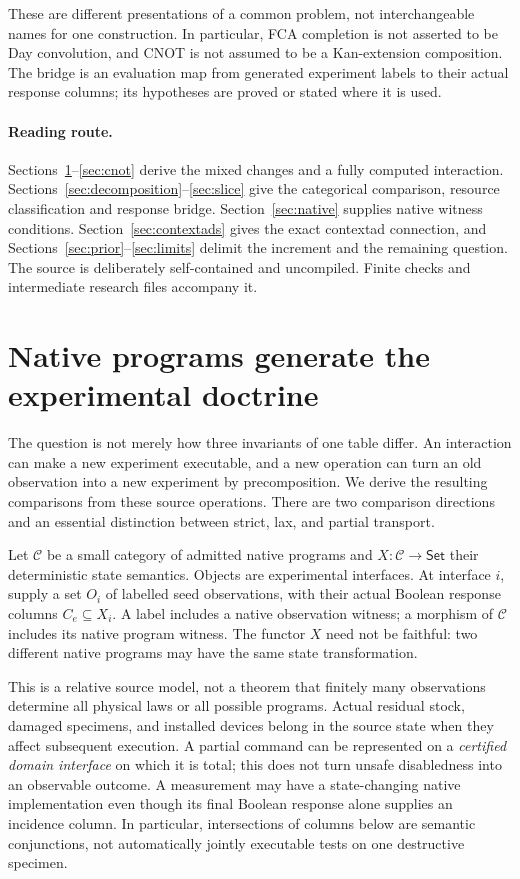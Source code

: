 \documentclass[11pt]{article}
\theoremstyle{definition}\newtheorem{definition}[theorem]{Definition}
\theoremstyle{remark}\newtheorem{remark}[theorem]{Remark}
\begin{document}
These are different presentations of a common problem, not interchangeable
names for one construction. In particular, FCA completion is not asserted
to be Day convolution, and CNOT is not assumed to be a Kan-extension
composition. The bridge is an evaluation map from generated experiment
labels to their actual response columns; its hypotheses are proved or
stated where it is used.

\paragraph{Reading route.}
Sections~\ref{sec:source}--\ref{sec:cnot} derive the mixed changes and a
fully computed interaction. Sections~\ref{sec:decomposition}--\ref{sec:slice}
give the categorical comparison, resource classification and response
bridge. Section~\ref{sec:native} supplies native witness conditions.
Section~\ref{sec:contextads} gives the exact contextad connection, and
Sections~\ref{sec:prior}--\ref{sec:limits} delimit the increment and the
remaining question. The source is deliberately self-contained and
uncompiled. Finite checks and intermediate research files accompany it.


\section{Native programs generate the experimental doctrine}\label{sec:source}
The question is not merely how three invariants of one table differ.
An interaction can make a new experiment executable, and a new operation
can turn an old observation into a new experiment by precomposition.
We derive the resulting comparisons from these source operations. There
are two comparison directions and an essential distinction between
strict, lax, and partial transport.

Let $\mathcal C$ be a small category of admitted native programs and
$X:\mathcal C\to\mathsf{Set}$ their deterministic state semantics.
Objects are experimental interfaces. At interface $i$, supply a set
$O_i$ of labelled seed observations, with their actual Boolean response
columns $C_e\subseteq X_i$. A label includes a native observation
witness; a morphism of $\mathcal C$ includes its native program witness.
The functor $X$ need not be faithful: two different native programs may
have the same state transformation.

This is a relative source model, not a theorem that finitely many
observations determine all physical laws or all possible programs.
Actual residual stock, damaged specimens, and installed devices belong
in the source state when they affect subsequent execution. A partial
command can be represented on a \emph{certified domain interface} on
which it is total; this does not turn unsafe disabledness into an
observable outcome. A measurement may have a state-changing native
implementation even though its final Boolean response alone supplies
an incidence column. In particular, intersections of columns below are
semantic conjunctions, not automatically jointly executable tests on
one destructive specimen.
\end{document}
